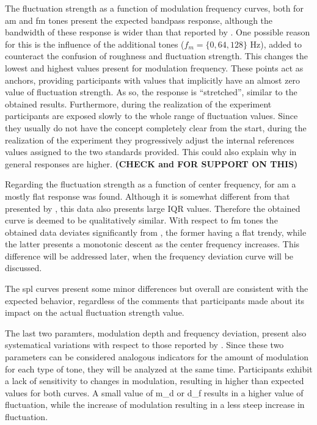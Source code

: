 \documentclass[../main.tex]{subfiles}
\begin{document}
The fluctuation strength as a function of modulation frequency curves, both for
\gls{am} and \gls{fm} tones present the expected bandpass response, although
the bandwidth of these response is wider than that reported by
\citeauthor{Fastl2007Psychoacoustics}. One possible reason for this is the
influence of the additional tones ($f_m = \{0, 64, 128\}$ Hz), added to
counteract the confusion of roughness and fluctuation strength. This changes
the lowest and highest values present for modulation frequency. These points
act as anchors, providing participants with values that implicitly have an
almost zero value of fluctuation strength. As so, the response is ``stretched'',
similar to the obtained results. Furthermore, during the realization of the
experiment participants are exposed slowly to the whole range of fluctuation
values. Since they usually do not have the concept completely clear from the
start, during the realization of the experiment they progressively adjust the
internal references values assigned to the two standards provided. This could
also explain why in general responses are higher. {\color{red} \bf (CHECK
\cite{Krantz1972} and \cite{Marley1972} FOR SUPPORT ON THIS)}

Regarding the fluctuation strength as a function of center frequency, for
\gls{am} a mostly flat response was found. Although it is somewhat different
from that presented by \citeauthor{Fastl2007Psychoacoustics}, this data also
presents large \gls{IQR} values. Therefore the obtained curve is deemed to be
qualitatively similar. With respect to \gls{fm} tones the obtained data
deviates significantly from \citeauthor{Fastl2007Psychoacoustics}, the former
having a flat trendy, while the latter presents a monotonic descent as the
center frequency increases. This difference will be addressed later, when the
frequency deviation curve will be discussed.

The \gls{spl} curves present some minor differences but overall are consistent
with the expected behavior, regardless of the comments that participants made
about its impact on the actual fluctuation strength value.

The last two paramters, modulation depth and frequency deviation, present also
systematical variations with respect to those reported by
\citeauthor{Fastl2007Psychoacoustics}. Since these two parameters can be
considered analogous indicators for the amount of modulation for each type of
tone, they will be analyzed at the same time. Participants exhibit a lack of
sensitivity to changes in modulation, resulting in higher than expected values
for both curves. A small value of \gls{m_d} or \gls{d_f} results in a higher
value of fluctuation, while the increase of modulation resulting in a less
steep increase in fluctuation.
\end{document}
